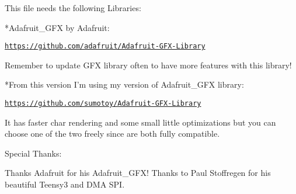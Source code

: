 This file needs the following Libraries\+: \begin{DoxyVerb}*Adafruit_GFX by Adafruit:
\end{DoxyVerb}


\href{https://github.com/adafruit/Adafruit-GFX-Library}{\tt https\+://github.\+com/adafruit/\+Adafruit-\/\+G\+F\+X-\/\+Library} \begin{DoxyVerb}Remember to update GFX library often to have more features with this library!

*From this version I'm using my version of Adafruit_GFX library:
\end{DoxyVerb}


\href{https://github.com/sumotoy/Adafruit-GFX-Library}{\tt https\+://github.\+com/sumotoy/\+Adafruit-\/\+G\+F\+X-\/\+Library} \begin{DoxyVerb}It has faster char rendering and some small little optimizations but you can
choose one of the two freely since are both fully compatible.
\end{DoxyVerb}
 \textquotesingle{}\textquotesingle{}\textquotesingle{}\textquotesingle{}\textquotesingle{}\textquotesingle{}\textquotesingle{}\textquotesingle{}\textquotesingle{}\textquotesingle{}\textquotesingle{}\textquotesingle{}\textquotesingle{}\textquotesingle{}\textquotesingle{}\textquotesingle{}\textquotesingle{}\textquotesingle{}\textquotesingle{}\textquotesingle{}\textquotesingle{}\textquotesingle{}\textquotesingle{}\textquotesingle{}\textquotesingle{}\textquotesingle{}\textquotesingle{}\textquotesingle{}\textquotesingle{}\textquotesingle{}\textquotesingle{}\textquotesingle{}\textquotesingle{}\textquotesingle{}\textquotesingle{}\textquotesingle{}\textquotesingle{}\textquotesingle{}\textquotesingle{}\textquotesingle{}\textquotesingle{}\textquotesingle{}\textquotesingle{}\textquotesingle{}\textquotesingle{}\textquotesingle{}\textquotesingle{}\textquotesingle{}\textquotesingle{}\textquotesingle{}\textquotesingle{}\textquotesingle{}\textquotesingle{}\textquotesingle{}\textquotesingle{}\textquotesingle{}\textquotesingle{}\textquotesingle{}\textquotesingle{}\textquotesingle{}\textquotesingle{}\textquotesingle{}\textquotesingle{}\textquotesingle{}\textquotesingle{}\textquotesingle{}\textquotesingle{}\textquotesingle{}\textquotesingle{}\textquotesingle{}\textquotesingle{}\textquotesingle{}\textquotesingle{}\textquotesingle{}\textquotesingle{}\textquotesingle{}

Special Thanks\+: \begin{DoxyVerb}Thanks Adafruit for his Adafruit_GFX!
Thanks to Paul Stoffregen for his beautiful Teensy3 and DMA SPI.
\end{DoxyVerb}


